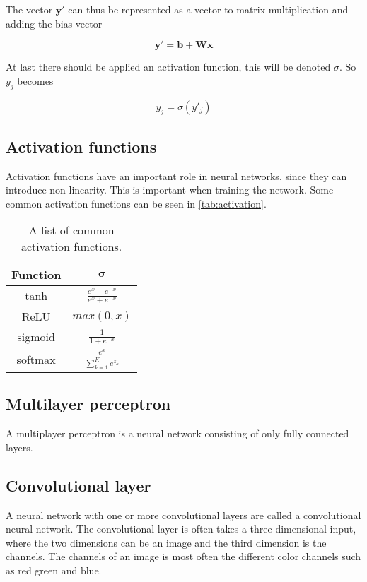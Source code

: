 \documentclass{article}
\begin{document}
The vector $\bm{y'}$ can thus be represented as a vector to matrix multiplication and adding the bias vector

$$\bm{y'} = \bm{b} + \bm{W}\bm{x}$$

At last there should be applied an activation function, this will be denoted $\sigma$.
So $y_j$ becomes

$$y_j = \sigma \left(y'_j\right)$$

\subsection{Activation functions}%
\label{sub:Activation functions}

Activation functions have an important role in neural networks, since they can introduce non-linearity. This is important when training the network.
Some common activation functions can be seen in \autoref{tab:activation}.

\begin{table}[H]
\centering
\begin{tabular}{|c|c|}\hline
\textbf{Function} & $\bm{\sigma}$ \\\hline
tanh     & $\frac{e^x - e^{-x}}{e^x + e^{-x}}$ \\\hline
ReLU     & $max(0, x)$ \\\hline
sigmoid  & $\frac{1}{1+e^{-x}}$ \\\hline
softmax  & $\frac{e^x}{\sum^K_{k=1} e^{z_k}}$ \\\hline
\end{tabular}
\caption{A list of common activation functions.}
\label{tab:activation}
\end{table}

\subsection{Multilayer perceptron}%
\label{sub:Multilayer perceptron}

A multiplayer perceptron is a neural network consisting of only fully connected layers.

\subsection{Convolutional layer}

A neural network with one or more convolutional layers are called a convolutional neural network.
The convolutional layer is often takes a three dimensional input, where the two dimensions can be an image and the third dimension is the channels. The channels of an image is most often the different color channels such as red green and blue.
\end{document}
